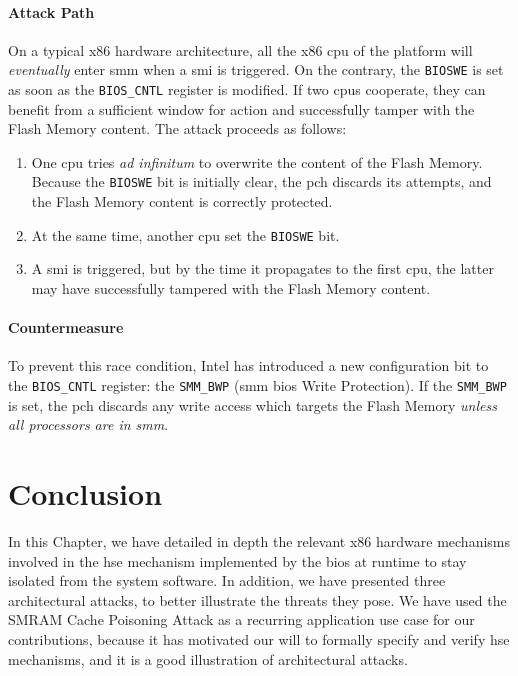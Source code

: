 \paragraph{Attack Path}
%
On a typical x86 hardware architecture, all the x86 \ac{cpu} of the platform
will \emph{eventually} enter \ac{smm} when a \ac{smi} is triggered.
%
On the contrary, the \texttt{BIOSWE} is set as soon as the \texttt{BIOS\_CNTL}
register is modified.
%
If two \acp{cpu} cooperate, they can benefit from a sufficient window for action
and successfully tamper with the Flash Memory content.
%
The attack proceeds as follows:

\begin{enumerate}
\item One \ac{cpu} tries \emph{ad infinitum} to overwrite the content of the
  Flash Memory. Because the \texttt{BIOSWE} bit is initially clear, the \ac{pch}
  discards its attempts, and the Flash Memory content is correctly protected.
%
\item At the same time, another \ac{cpu} set the \texttt{BIOSWE} bit.
%
\item A \ac{smi} is triggered, but by the time it propagates to the first
  \ac{cpu}, the latter  may have successfully tampered with the Flash Memory
  content.
%
\end{enumerate}

\paragraph{Countermeasure}
%
To prevent this race condition, Intel has introduced a new configuration bit to
the \texttt{BIOS\_CNTL} register: the \texttt{SMM\_BWP} (\ac{smm} \ac{bios}
Write Protection).
%
If the \texttt{SMM\_BWP} is set, the \ac{pch} discards any write access which
targets the Flash Memory \emph{unless all processors are in \ac{smm}}.

\section{Conclusion}
\label{sec:usecase:conclusion}

In this Chapter, we have detailed in depth  the relevant x86 hardware mechanisms
involved in the \ac{hse} mechanism implemented by the \ac{bios} at runtime to
stay isolated from the system software.
%
In addition, we have presented three architectural attacks, to better illustrate
the threats they pose.
%
We have used the SMRAM Cache Poisoning Attack as a recurring application use
case for our contributions, because it has motivated our will to formally
specify and verify \ac{hse} mechanisms, and it is a good illustration of
architectural attacks. 
